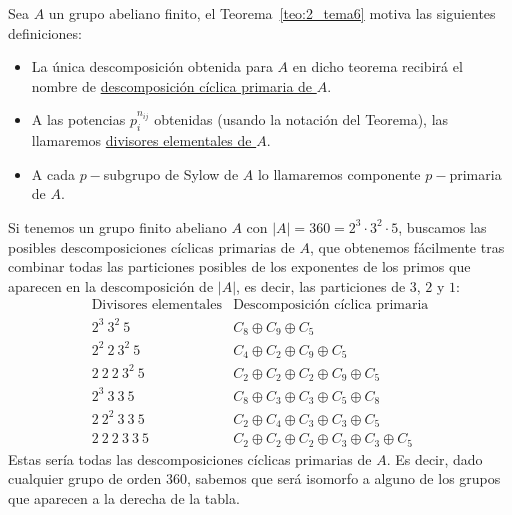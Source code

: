\begin{definicion}
    Sea $A$ un grupo abeliano finito, el Teorema~\ref{teo:2_tema6} motiva las siguientes definiciones:
    \begin{itemize}
        \item La única descomposición obtenida para $A$ en dicho teorema recibirá el nombre de \underline{descomposición cíclica primaria de $A$}.
        \item A las potencias $p_i^{n_{ij}}$ obtenidas (usando la notación del Teorema), las llamaremos \underline{divisores elementales de $A$}.
        \item A cada $p-$subgrupo de Sylow de $A$ lo llamaremos componente $p-$primaria de $A$.
    \end{itemize}
\end{definicion}

\begin{ejemplo}
    Si tenemos un grupo finito abeliano $A$ con $|A| = 360 = 2^3\cdot 3^2\cdot 5$, buscamos las posibles descomposiciones cíclicas primarias de $A$, que obtenemos fácilmente tras combinar todas las particiones posibles de los exponentes de los primos que aparecen en la descomposición de $|A|$, es decir, las particiones de $3$, $2$ y $1$:
    \begin{equation*}
        \begin{array}{r|l}
            \text{Divisores elementales} & \text{Descomposición cíclica primaria} \\
            \hline
            2^3\ 3^2\ 5 & C_8\oplus C_9 \oplus C_5 \\
            2^2\ 2\ 3^2\ 5 & C_4\oplus C_2 \oplus C_9 \oplus C_5\\
            2\ 2\ 2\ 3^2\ 5 & C_2 \oplus C_2 \oplus C_2 \oplus C_9 \oplus C_5\\
            2^3\ 3\ 3\ 5 & C_8\oplus C_3 \oplus C_3 \oplus C_5 \oplus C_8\\
            2\ 2^2\ 3\ 3\ 5 & C_2 \oplus C_4 \oplus C_3 \oplus C_3 \oplus C_5\\
            2\ 2\ 2\ 3\ 3\ 5 & C_2 \oplus C_2 \oplus C_2 \oplus C_3 \oplus C_3 \oplus C_5
        \end{array}
    \end{equation*}
    Estas sería todas las descomposiciones cíclicas primarias de $A$. Es decir, dado cualquier grupo de orden $360$, sabemos que será isomorfo a alguno de los grupos que aparecen a la derecha de la tabla.
\end{ejemplo}

